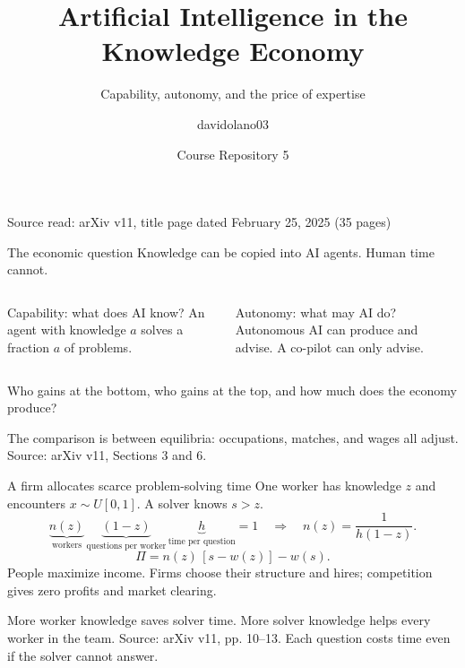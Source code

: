\documentclass[aspectratio=169,11pt]{beamer}
\title{Artificial Intelligence in the Knowledge Economy}
\subtitle{Capability, autonomy, and the price of expertise}
\author{davidolano03}
\institute{Ide \& Talam\`as (2025), Journal of Political Economy\\[5pt]
\href{https://github.com/davidolano03/ai-05-ide}{\texttt{github.com/davidolano03/ai-05-ide}}}
\date{Course Repository 5}
\newcommand{\ai}{a}
\newcommand{\src}[1]{\vfill{\scriptsize\color{gray}Source: arXiv v11, #1.}}
\begin{document}
\begin{frame}
\titlepage
\vspace{-7mm}
\centering\footnotesize Source read: arXiv v11, title page dated February 25, 2025 (35 pages)
\end{frame}

\begin{frame}{The economic question}
Knowledge can be copied into AI agents. Human time cannot.
\begin{columns}[T]
\begin{block}{Capability: what does AI know?}
An agent with knowledge $\ai$ solves a fraction $\ai$ of problems.
\end{block}
\begin{block}{Autonomy: what may AI do?}
Autonomous AI can produce and advise. A co-pilot can only advise.
\end{block}
\end{columns}
\medskip
Who gains at the bottom, who gains at the top, and how much does the economy produce?

The comparison is between equilibria: occupations, matches, and wages all adjust.
\src{Sections 3 and 6}
\end{frame}

\begin{frame}{A firm allocates scarce problem-solving time}
One worker has knowledge $z$ and encounters $x\sim U[0,1]$. A solver knows $s>z$.
\[
\underbrace{n(z)}_{\text{workers}}\,
\underbrace{(1-z)}_{\text{questions per worker}}\,
\underbrace{h}_{\text{time per question}}=1
\quad\Longrightarrow\quad n(z)=\frac{1}{h(1-z)}.
\]
\[
\Pi=n(z)\,[s-w(z)]-w(s).
\]
People maximize income. Firms choose their structure and hires; competition gives zero profits and market clearing.

More worker knowledge saves solver time. More solver knowledge helps every worker in the team.
\src{pp. 10--13. Each question costs time even if the solver cannot answer}
\end{frame}
\end{document}
